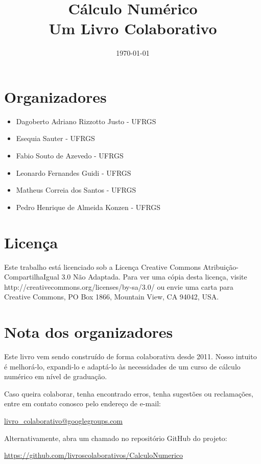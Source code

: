 \documentclass[12pt]{book}
\begin{document}
\frontmatter

\title{Cálculo Numérico\\\small{Um Livro Colaborativo}}
\author{}
\date{\today}

\AddToShipoutPicture*{\BackgroundPic}
\maketitle


\chapter*{Organizadores}

\begin{itemize}
\item[] Dagoberto Adriano Rizzotto Justo - UFRGS
\item[] Esequia Sauter - UFRGS
\item[] Fabio Souto de Azevedo - UFRGS
\item[] Leonardo Fernandes Guidi - UFRGS
\item[] Matheus Correia dos Santos - UFRGS
\item[] Pedro Henrique de Almeida Konzen - UFRGS
\end{itemize}

\chapter*{Licença}

Este trabalho está licenciado sob a Licença Creative Commons Atribuição-CompartilhaIgual 3.0 Não Adaptada. Para ver uma cópia desta licença, visite http://creativecommons.org/licenses/by-sa/3.0/ ou envie uma carta para Creative Commons, PO Box 1866, Mountain View, CA 94042, USA.
 
\chapter*{Nota dos organizadores}

Este livro vem sendo construído de forma colaborativa desde 2011. Nosso intuito é melhorá-lo, expandi-lo e adaptá-lo às necessidades de um curso de cálculo numérico em nível de graduação.

Caso queira colaborar, tenha encontrado erros, tenha sugestões ou reclamações, entre em contato conosco pelo endereço de e-mail:
\begin{center}
\url{livro_colaborativo@googlegroups.com}  
\end{center}
Alternativamente, abra um chamado no repositório GitHub do projeto:
\begin{center}
\url{https://github.com/livroscolaborativos/CalculoNumerico}  
\end{center}
\end{document}
